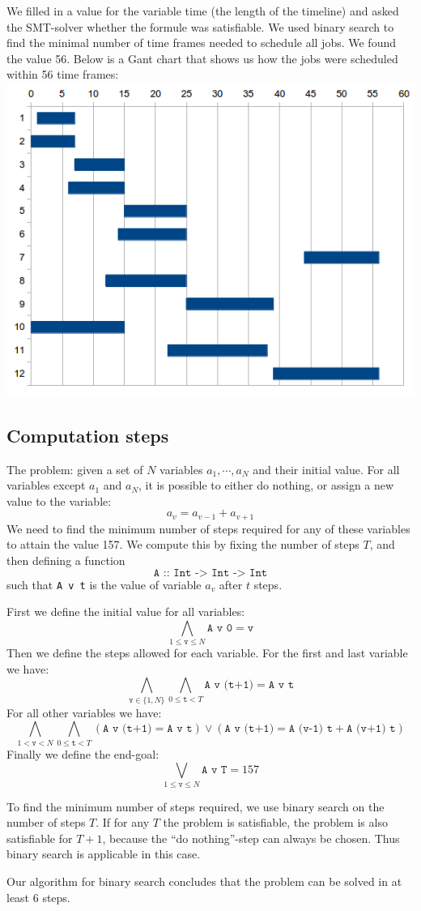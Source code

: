 \documentclass[12pt]{article}
\begin{document}
We filled in a value for the variable time (the length of the timeline) 
and asked the SMT-solver whether the formule was satisfiable. 
We used binary search to find the minimal number of time frames needed to schedule all jobs. 
We found the value 56. 
Below is a Gant chart that shows us how the jobs were scheduled within 56 time frames:
\includegraphics[width=15cm]{gantchart.png}

\subsection*{Computation steps}
The problem: given a set of $N$ variables $a_1, \cdots, a_N$ and their initial value.
For all variables except $a_1$ and $a_N$, it is possible to either do nothing, or assign a new value to the variable:
\[ a_v = a_{v-1} + a_{v+1} \]
We need to find the minimum number of steps required for any of these variables to attain the value 157.
We compute this by fixing the number of steps $T$, and then defining a function
\[\texttt{A :: Int -> Int -> Int}\]
such that \texttt{A v t} is the value of variable $a_v$ after $t$ steps.

First we define the initial value for all variables:
\[ \bigwedge_{1 \le \texttt{v} \le N} \texttt{A v 0} = \texttt{v} \]
Then we define the steps allowed for each variable.
For the first and last variable we have:
\[ \bigwedge_{\texttt{v} \in \{1, N\}} \bigwedge_{0 \le \texttt{t} < T} \texttt{A v (t+1)} = \texttt{A v t} \]
For all other variables we have:
\[ \bigwedge_{1 < \texttt{v} < N} \bigwedge_{0 \le \texttt{t} < T} (\texttt{A v (t+1)} = \texttt{A v t}) \vee (\texttt{A v (t+1)} = \texttt{A (v-1) t} + \texttt{A (v+1) t}) \]
Finally we define the end-goal:
\[ \bigvee_{1 \le \texttt{v} \le N} \texttt{A v T} = 157 \]

To find the minimum number of steps required, we use binary search on the number of steps $T$.
If for any $T$ the problem is satisfiable, the problem is also satisfiable for $T+1$, because the ``do nothing''-step can always be chosen.
Thus binary search is applicable in this case.

Our algorithm for binary search concludes that the problem can be solved in at least 6 steps.
\end{document}
